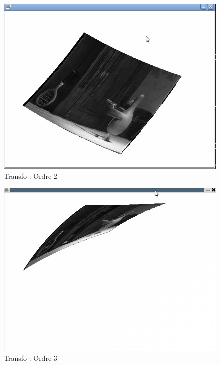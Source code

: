 \documentclass{beamer}
\begin{document}
\begin{frame}
\begin{figure}[!h]
\centering
\includegraphics[scale = 0.3]{Transfo_ordre_2.png}
\caption{Transfo : Ordre 2}
\end{figure}
\end{frame}

\begin{frame}
\begin{figure}[!h]
\centering
\includegraphics[scale = 0.3]{ordre3.png}
\caption{Transfo : Ordre 3}
\end{figure}
\end{frame}
\end{document}
